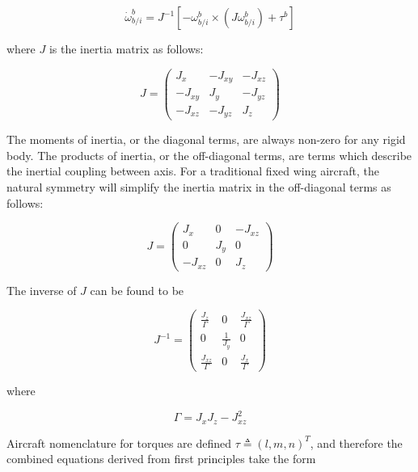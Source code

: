 \begin{equation}
\dot{\omega}_{b/i}^b=J^{-1}\left[-\omega_{b/i}^b\times\left(J\omega_{b/i}^b\right)+\tau^b\right]
\end{equation}

where $J$ is the inertia matrix as follows:

\begin{equation}
J=
 \begin{pmatrix}
 J_x & -J_{xy} & -J_{xz}\\
 -J_{xy} & J_y & -J_{yz}\\
 -J_{xz} & -J_{yz} & J_z
 \end{pmatrix}
\end{equation}

The moments of inertia, or the diagonal terms, are always non-zero for any rigid body.  The products of inertia, or the off-diagonal terms, are terms which describe the inertial coupling between axis.  For a traditional fixed wing aircraft, the natural symmetry will simplify the inertia matrix in the off-diagonal terms as follows:

\begin{equation}
J=
 \begin{pmatrix}
 J_x & 0 & -J_{xz}\\
 0 & J_y & 0\\
 -J_{xz} & 0 & J_z
 \end{pmatrix}
\end{equation}

The inverse of $J$ can be found to be

\begin{equation}
J^{-1}=
 \begin{pmatrix}
 \frac{J_z}{\Gamma} & 0 & \frac{J_{xz}}{\Gamma}\\
 0 & \frac{1}{J_y} & 0\\
 \frac{J_{xz}}{\Gamma} & 0 & \frac{J_x}{\Gamma}
 \end{pmatrix}
\end{equation}

where

\begin{equation}
\Gamma = J_xJ_z-J_{xz}^2
\end{equation}

Aircraft nomenclature for torques are defined $\tau\triangleq(l,m,n)^T$, and therefore the combined equations derived from first principles take the form


